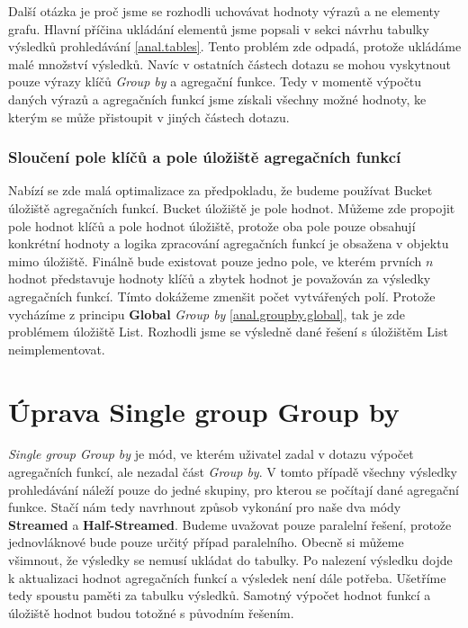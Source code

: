 Další otázka je proč jsme se rozhodli uchovávat hodnoty výrazů a ne elementy grafu.
Hlavní příčina ukládání elementů jsme popsali v sekci návrhu tabulky výsledků prohledávání \ref{anal.tables}.
Tento problém zde odpadá, protože ukládáme malé množství výsledků.
Navíc v ostatních částech dotazu se mohou vyskytnout pouze výrazy klíčů \textit{Group by} a agregační funkce.
Tedy v momentě výpočtu daných výrazů a agregačních funkcí jsme získali všechny možné hodnoty, ke kterým se může přistoupit v jiných částech dotazu. 

\subsubsection{Sloučení pole klíčů a pole úložiště agregačních funkcí}

Nabízí se zde malá optimalizace za předpokladu, že budeme používat Bucket úložiště agregačních funkcí.
Bucket úložiště je pole hodnot.
Můžeme zde propojit pole hodnot klíčů a pole hodnot úložiště, protože oba pole pouze obsahují konkrétní hodnoty a logika zpracování agregačních funkcí je obsažena v objektu mimo úložiště.
Finálně bude existovat pouze jedno pole, ve kterém prvních $n$ hodnot představuje hodnoty klíčů a zbytek hodnot je považován za výsledky agregačních funkcí.
Tímto dokážeme zmenšit počet vytvářených polí.
Protože vycházíme z principu \textbf{Global} \textit{Group by} \ref{anal.groupby.global}, tak je zde problémem úložiště List.
Rozhodli jsme se výsledně dané řešení s úložištěm List neimplementovat.


\section{Úprava Single group Group by} \label{anal.improvement.singlegroup}

\textit{Single group Group by} je mód, ve kterém uživatel zadal v dotazu výpočet agregačních funkcí, ale nezadal část \textit{Group by}.
V tomto případě všechny výsledky prohledávání náleží pouze do jedné skupiny, pro kterou se počítají dané agregační funkce.
Stačí nám tedy navrhnout způsob vykonání pro naše dva módy \textbf{Streamed} a \textbf{Half-Streamed}.
Budeme uvažovat pouze paralelní řešení, protože jednovláknové bude pouze určitý případ paralelního.
Obecně si můžeme všimnout, že výsledky se nemusí ukládat do tabulky.
Po nalezení výsledku dojde k aktualizaci hodnot agregačních funkcí a výsledek není dále potřeba.
Ušetříme tedy spoustu paměti za tabulku výsledků.
Samotný výpočet hodnot funkcí a úložiště hodnot budou totožné s původním řešením.

